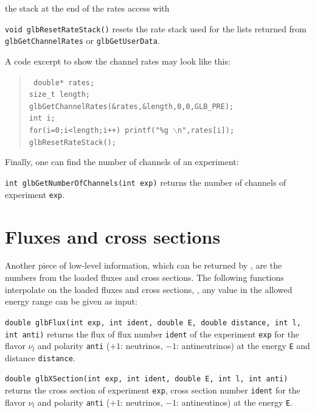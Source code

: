 the stack at the end of the rates access with
\begin{function}
{\tt void glbResetRateStack()} resets the rate stack used for the
lists returned from {\tt glbGetChannelRates} or {\tt glbGetUserData}.
\end{function}
A code excerpt to show the channel rates may look like this:
\begin{quote}
{\tt
 double* rates; \\
  size\_t length; \\
  glbGetChannelRates(\&rates,\&length,0,0,GLB\_PRE); \\
  int i; \\
  for(i=0;i<length;i++) printf("\%g $\backslash$n",rates[i]); \\
  glbResetRateStack(); \\
}
\end{quote}
Finally, one can find the number of channels of an experiment:
\begin{function}
{\tt int glbGetNumberOfChannels(int exp)} returns the number of 
channels of experiment {\tt exp}.
\end{function}

\section{Fluxes and cross sections}
 

Another piece of low-level information, which can be returned by \GLOBES ,
are the numbers from the loaded fluxes and cross sections.
The following functions interpolate on the loaded fluxes and cross 
sections, \ie, any value in the allowed energy range can be given as input:
\begin{function}
{\tt double glbFlux(int exp, int ident, 
double E, double distance, int l, int anti)} returns
the flux of flux number {\tt ident} of the experiment {\tt exp}
for the flavor $\nu_l$ 
and polarity {\tt anti} ($+1$: neutrinos, $-1$: antineutrinos) at the energy {\tt E} and distance {\tt distance}.
\end{function}

\begin{function}
{\tt double glbXSection(int exp, 
int ident, double E, int l, int anti)} returns
the cross section of experiment {\tt exp}, 
cross section number {\tt ident} for the flavor $\nu_l$ and polarity {\tt anti} ($+1$: neutrinos, $-1$: antineutinos) at the energy {\tt E}.
\end{function}



